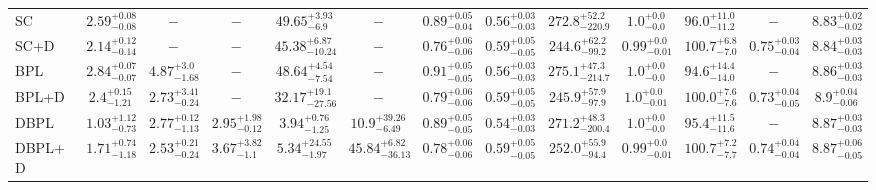 \begin{table*}
{\begin{tabular}{lcccccccccccc}
SC & $2.59^{+0.08}_{-0.08}$ & $-$ & $-$ & $49.65^{+3.93}_{-6.9}$ & $-$ & $0.89^{+0.05}_{-0.04}$ & $0.56^{+0.03}_{-0.03}$ & $272.8^{+52.2}_{-220.9}$ & $1.0^{+0.0}_{-0.0}$ & $96.0^{+11.0}_{-11.2}$ & $-$ & $8.83^{+0.02}_{-0.02}$ \\ 
SC+D & $2.14^{+0.12}_{-0.14}$ & $-$ & $-$ & $45.38^{+6.87}_{-10.24}$ & $-$ & $0.76^{+0.06}_{-0.06}$ & $0.59^{+0.05}_{-0.05}$ & $244.6^{+62.2}_{-99.2}$ & $0.99^{+0.0}_{-0.01}$ & $100.7^{+6.8}_{-7.0}$ & $0.75^{+0.03}_{-0.04}$ & $8.84^{+0.03}_{-0.03}$ \\ 
BPL & $2.84^{+0.07}_{-0.07}$ & $4.87^{+3.0}_{-1.68}$ & $-$ & $48.64^{+4.54}_{-7.54}$ & $-$ & $0.91^{+0.05}_{-0.05}$ & $0.56^{+0.03}_{-0.03}$ & $275.1^{+47.3}_{-214.7}$ & $1.0^{+0.0}_{-0.0}$ & $94.6^{+14.4}_{-14.0}$ & $-$ & $8.86^{+0.03}_{-0.03}$ \\ 
BPL+D & $2.4^{+0.15}_{-1.21}$ & $2.73^{+3.41}_{-0.24}$ & $-$ & $32.17^{+19.1}_{-27.56}$ & $-$ & $0.79^{+0.06}_{-0.06}$ & $0.59^{+0.05}_{-0.05}$ & $245.9^{+57.9}_{-97.9}$ & $1.0^{+0.0}_{-0.01}$ & $100.0^{+7.6}_{-7.6}$ & $0.73^{+0.04}_{-0.05}$ & $8.9^{+0.04}_{-0.06}$ \\ 
DBPL & $1.03^{+1.12}_{-0.73}$ & $2.77^{+0.12}_{-1.13}$ & $2.95^{+1.98}_{-0.12}$ & $3.94^{+0.76}_{-1.25}$ & $10.9^{+39.26}_{-6.49}$ & $0.89^{+0.05}_{-0.05}$ & $0.54^{+0.03}_{-0.03}$ & $271.2^{+48.3}_{-200.4}$ & $1.0^{+0.0}_{-0.0}$ & $95.4^{+11.5}_{-11.6}$ & $-$ & $8.87^{+0.03}_{-0.03}$ \\ 
DBPL+D & $1.71^{+0.74}_{-1.18}$ & $2.53^{+0.21}_{-0.24}$ & $3.67^{+3.82}_{-1.1}$ & $5.34^{+24.55}_{-1.97}$ & $45.84^{+6.82}_{-36.13}$ & $0.78^{+0.06}_{-0.06}$ & $0.59^{+0.05}_{-0.05}$ & $252.0^{+55.9}_{-94.4}$ & $0.99^{+0.0}_{-0.01}$ & $100.7^{+7.2}_{-7.7}$ & $0.74^{+0.04}_{-0.04}$ & $8.87^{+0.06}_{-0.05}$ \\ 
\hline 


\end{tabular}
}

\end{table*}
\endgroup



